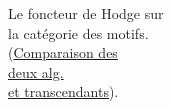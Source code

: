 Le foncteur de Hodge sur\\
la catégorie des motifs.\\
(\uline{Comparaison des}\\
\uline{deux  alg.}\\
\uline{et transcendants}).

